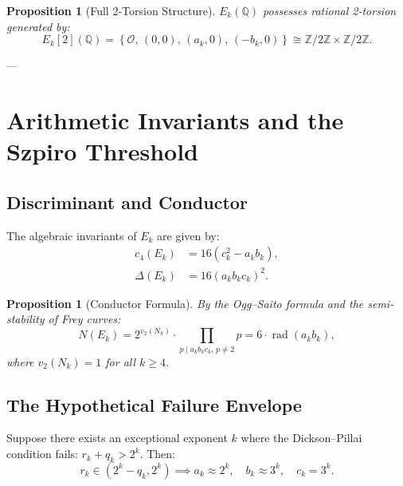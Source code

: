 \documentclass[11pt,reqno]{amsart}
\newtheorem{proposition}[theorem]{Proposition}
\theoremstyle{definition}
\numberwithin{equation}{section}
\begin{document}
\begin{proposition}[Full 2-Torsion Structure]
$E_k(\mathbb{Q})$ possesses rational 2-torsion generated by:
\begin{equation}
E_k[2](\mathbb{Q}) = \left\{ \mathcal{O}, \, (0, 0), \, (a_k, 0), \, (-b_k, 0) \right\} \cong \mathbb{Z}/2\mathbb{Z} \times \mathbb{Z}/2\mathbb{Z}.
\end{equation}
\end{proposition}

---

\section{Arithmetic Invariants and the Szpiro Threshold}

\subsection{Discriminant and Conductor}
The algebraic invariants of $E_k$ are given by:
\begin{align}
c_4(E_k) &= 16 (c_k^2 - a_k b_k), \\
\Delta(E_k) &= 16 (a_k b_k c_k)^2.
\end{align}

\begin{proposition}[Conductor Formula]
By the Ogg--Saito formula and the semi-stability of Frey curves:
\begin{equation}
N(E_k) = 2^{v_2(N_k)} \cdot \prod_{p \mid a_k b_k c_k, \, p \ne 2} p = 6 \cdot \operatorname{rad}(a_k b_k),
\end{equation}
where $v_2(N_k) = 1$ for all $k \ge 4$.
\end{proposition}

\subsection{The Hypothetical Failure Envelope}
Suppose there exists an exceptional exponent $k$ where the Dickson--Pillai condition fails: $r_k + q_k > 2^k$.
Then:
\begin{equation}
r_k \in \left(2^k - q_k, 2^k\right) \implies a_k \approx 2^k, \quad b_k \approx 3^k, \quad c_k = 3^k.
\end{equation}
\end{document}
